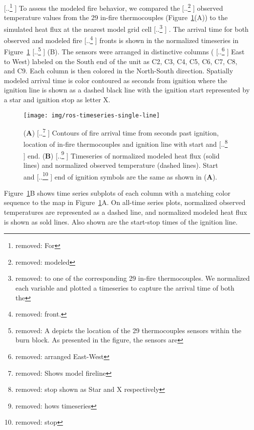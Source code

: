 \documentclass[preprints,article,accept,moreauthors,pdftex]{Definitions/mdpi}
\providecommand{\DIFadd}[1]{{\protect\color{blue} \sf #1}} %
\providecommand{\DIFdel}[1]{{\protect\color{red} [..\footnote{removed: #1} ]}} %
\providecommand{\DIFaddbegin}{} %
\providecommand{\DIFaddend}{} %
\providecommand{\DIFdelbegin}{} %
\providecommand{\DIFdelend}{} %
\providecommand{\DIFaddFL}[1]{\DIFadd{#1}} %
\providecommand{\DIFdelFL}[1]{\DIFdel{#1}} %
\providecommand{\DIFaddbeginFL}{} %
\providecommand{\DIFaddendFL}{} %
\providecommand{\DIFdelbeginFL}{} %
\providecommand{\DIFdelendFL}{} %
\begin{document}
\DIFdelbegin \DIFdel{For }\DIFdelend \DIFaddbegin \DIFadd{To assess the modeled }\DIFaddend fire behavior, we compared the \DIFdelbegin \DIFdel{modeled }\DIFdelend \DIFaddbegin \DIFadd{observed temperature values from the 29 in-fire thermocouples (Figure~\ref{fig2}(A)) to the simulated }\DIFaddend heat flux at the nearest model grid cell\DIFdelbegin \DIFdel{to one of the corresponding 29 in-fire thermocouples. We normalized each variable and plotted a timeseries to capture the arrival time of both the }\DIFdelend \DIFaddbegin \DIFadd{. The arrival time for both }\DIFaddend observed and modeled fire \DIFdelbegin \DIFdel{front. }\DIFdelend \DIFaddbegin \DIFadd{fronts is shown in the normalized timeseries in }\DIFaddend Figure~\ref{fig2}\DIFdelbegin \DIFdel{A depicts the location of the 29 thermocouples sensors within the burn block.
As presented in the figure, the sensors are }\DIFdelend \DIFaddbegin \DIFadd{(B).
The sensors were arranged }\DIFaddend in distinctive columns (\DIFdelbegin \DIFdel{arranged East-West}\DIFdelend \DIFaddbegin \DIFadd{East to West}\DIFaddend ) labeled on the South end of the unit as C2, C3, C4, C5, C6, C7, C8, and C9. Each column is then colored in the North-South direction. Spatially modeled arrival time is color contoured as seconds from ignition where the ignition line is shown as a dashed black line with the ignition start represented by a star and ignition stop as letter X.

\begin{figure}[H]
\centering
 \texttt{[image: img/ros-timeseries-single-line]}
 \caption{(\textbf{A}) \DIFdelbeginFL \DIFdelFL{Shows model fireline }\DIFdelendFL \DIFaddbeginFL \DIFaddFL{Contours of fire }\DIFaddendFL arrival time from seconds past ignition, location of in-fire thermocouples and ignition line with start and \DIFdelbeginFL \DIFdelFL{stop shown as Star and X respectively}\DIFdelendFL \DIFaddbeginFL \DIFaddFL{end}\DIFaddendFL . (\textbf{B}) \DIFdelbeginFL \DIFdelFL{hows timeseries }\DIFdelendFL \DIFaddbeginFL \DIFaddFL{Timeseries }\DIFaddendFL of normalized modeled heat flux (solid lines) and normalized observed temperature (dashed lines). Start and \DIFdelbeginFL \DIFdelFL{stop }\DIFdelendFL \DIFaddbeginFL \DIFaddFL{end }\DIFaddendFL of ignition symbols are the same as shown in (\textbf{A}). \label{fig2}}
 \end{figure}

Figure~\ref{fig2}B shows time series subplots of each column with a matching color sequence to the map in Figure~\ref{fig2}A. On all-time series plots, normalized observed temperatures are represented as a dashed line, and normalized modeled heat flux is shown as sold lines. Also shown are the start-stop times of the ignition line.
\end{document}
